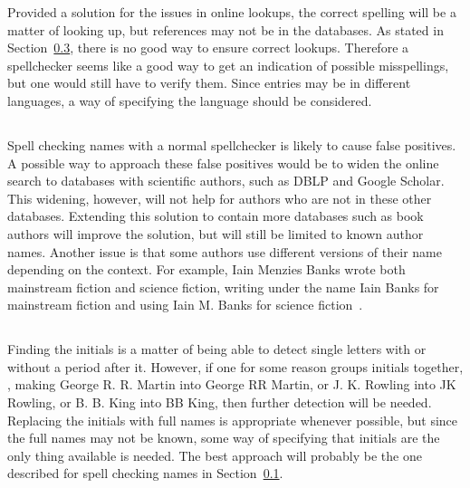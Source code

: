 Provided a solution for the issues in online lookups, the correct
spelling will be a matter of looking up, but references may not be in
the databases.  As stated in Section~\ref{sec:approach_look_ups},
there is no good way to ensure correct lookups.  Therefore a
spellchecker seems like a good way to get an indication of possible
misspellings, but one would still have to verify them.  Since entries
may be in different languages, a way of specifying the language should
be considered.


\subsection{}
\label{sec:approach_spelling_names}

Spell checking names with a normal spellchecker is likely to cause
false positives.  A possible way to approach these false positives
would be to widen the online search to databases with scientific
authors, such as DBLP and Google Scholar.  This widening, however,
will not help for authors who are not in these other databases.
Extending this solution to contain more databases such as book authors
will improve the solution, but will still be limited to known author
names.  Another issue is that some authors use different versions of
their name depending on the context.  For example, Iain Menzies Banks
wrote both mainstream fiction and science fiction, writing under the
name Iain Banks for mainstream fiction and using Iain M. Banks for
science fiction~\cite{community2016_banks}.


\subsection{}

Finding the initials is a matter of being able to detect single
letters with or without a period after it.  However, if one for some
reason groups initials together, \eg, making George R. R. Martin into
George RR Martin, or J. K. Rowling into JK Rowling, or B. B. King into
BB King, then further detection will be needed.  Replacing the
initials with full names is appropriate whenever possible, but since
the full names may not be known, some way of specifying that initials
are the only thing available is needed.  The best approach will
probably be the one described for spell checking names in
Section~\ref{sec:approach_spelling_names}.


\subsection{}
\label{sec:approach_look_ups}

